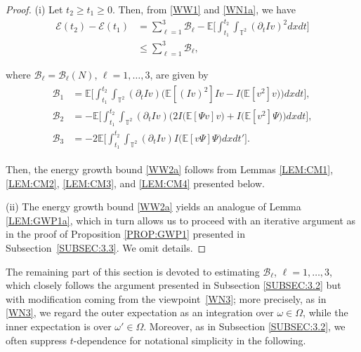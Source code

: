 \documentclass[letterpaper, 11pt,  reqno]{amsart}
\newcommand{\1}{\hspace{0.5mm}\text{I}\hspace{0.2mm}}
\newcommand{\noi}{\noindent}
\newcommand{\T}{\mathbb{T}}
\newcommand{\E}{\mathbb{E}}
\newcommand{\dt}{\partial_t}
\newcommand{\EE}{\mathcal{E}}
\newcommand{\B}{\mathcal{B}}
\renewcommand{\O}{\Omega}
\renewcommand{\o}{\omega}
\renewcommand{\l}{\ell}
\numberwithin{equation}{section}
\numberwithin{theorem}{section}
\begin{document}
\begin{proof}
(i)
Let  $t_2\ge t_1 \ge 0$.
Then, from \eqref{WW1} and \eqref{WN1a}, 
we have
\begin{align*}
\EE (t_2) - \EE (t_1) 
& = \sum_{\l = 1}^3 \B_\l
- 
\E \bigg[ \int_{t_1}^{t_2} \int_{\T^2} (\dt I v)^2 d x d t \bigg] \\ 
& \le  \sum_{\l = 1}^3 \B_\l, 
\end{align*} 


\noi
where $\B_\l = \B_\l(N)$, $\l = 1, \dots, 3$, 
are given by 
\begin{align}
\begin{split}
\B_1 
& = \E \bigg[ \int_{t_1}^{t_2} \int_{\T^2} (\dt I v) \Big( \E [ (I v)^2 ] I v - I \big( \E [v^2] v \big) \Big) d x d t \bigg] , \\
\B_2 
& = 
 - \E \bigg[ \int_{t_1}^{t_2} \int_{\T^2} (\dt I v) \Big( 
2  I \big( \E [\Psi v] v \big)
+  I \big( \E [v^2] \Psi \big) \Big) d x d t \bigg],  \\
\B_3 & = - 2 \E \bigg[ \int_{t_1}^{t_2} \int_{\T^2} (\dt I v) I \big( \E [v \Psi ] \Psi \big) d x d t' \bigg].
\end{split} 
\label{WW4}
\end{align}


\noi
Then, 
the energy growth bound \eqref{WW2a}
follows from 
Lemmas \ref{LEM:CM1}, \ref{LEM:CM2}, 
\ref{LEM:CM3}, and \ref{LEM:CM4}
presented below.

\medskip


\noi
(ii)
The energy growth bound \eqref{WW2a}
yields 
an analogue of 
Lemma \ref{LEM:GWP1a}, 
which in turn allows us to proceed
with an iterative argument as in the 
proof of Proposition \ref{PROP:GWP1}
presented in Subsection~\ref{SUBSEC:3.3}.
We omit details.
\end{proof}
















The remaining part of this section 
is devoted
 to estimating 
 $\B_\l$, $\l = 1, \dots, 3$, 
 which 
closely 
follows the argument presented in 
Subsection \ref{SUBSEC:3.2}
but
with 
modification coming from  the viewpoint~\eqref{WN3};
more precisely, as in \eqref{WN3}, 
we regard the outer expectation 
as an integration 
 over $\o \in \O$, 
while
the inner expectation 
is over $\o' \in \O$.
Moreover, 
as in 
Subsection \ref{SUBSEC:3.2}, 
we often suppress
$t$-dependence for notational simplicity
in the following.
\end{document}
